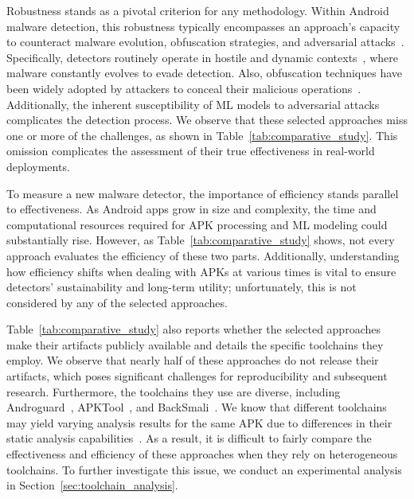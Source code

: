 Robustness stands as a pivotal criterion for any methodology. 
Within Android malware detection, this robustness typically encompasses an approach's capacity to counteract malware evolution, obfuscation strategies, and adversarial attacks~\cite{pendlebury2019tesseract}.
Specifically, detectors routinely operate in hostile and dynamic contexts~\cite{barbero2022transcending}, where malware constantly evolves to evade detection.
Also, obfuscation techniques have been widely adopted by attackers to conceal their malicious operations~\cite{aonzo2020obfuscapk}.
Additionally, the inherent susceptibility of ML models to adversarial attacks~\cite{li2023black,athalye2018obfuscated} complicates the detection process.
We observe that these selected approaches miss one or more of the challenges, as shown in Table~\ref{tab:comparative_study}.
This omission complicates the assessment of their true effectiveness in real-world deployments.

To measure a new malware detector, the importance of efficiency stands parallel to effectiveness.
As Android apps grow in size and complexity, the time and computational resources required for APK processing and ML modeling could substantially rise.
However, as Table~\ref{tab:comparative_study} shows, not every approach evaluates the efficiency of these two parts.
Additionally, understanding how efficiency shifts when dealing with APKs at various times is vital to ensure detectors' sustainability and long-term utility; unfortunately, this is not considered by any of the selected approaches.

Table~\ref{tab:comparative_study} also reports whether the selected approaches make their artifacts publicly available and details the specific toolchains they employ. 
We observe that nearly half of these approaches do not release their artifacts, which poses significant challenges for reproducibility and subsequent research. 
Furthermore, the toolchains they use are diverse, including Androguard~\cite{androguard}, APKTool~\cite{apkt}, and BackSmali~\cite{backsmali}.
We know that different toolchains may yield varying analysis results for the same APK due to differences in their static analysis capabilities~\cite{arp2014drebin,mariconti2016mamadroid}.
As a result, it is difficult to fairly compare the effectiveness and efficiency of these approaches when they rely on heterogeneous toolchains.
To further investigate this issue, we conduct an experimental analysis in Section~\ref{sec:toolchain_analysis}.

